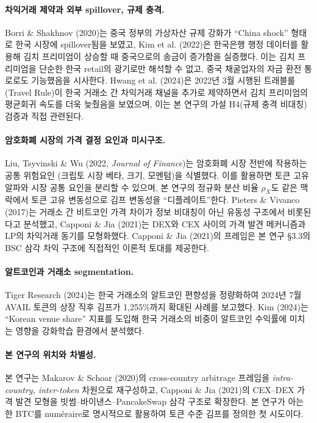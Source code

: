 \documentclass[11pt,a4paper]{article}
\begin{document}
\paragraph{차익거래 제약과 외부 spillover, 규제 충격.}
Borri \& Shakhnov (2020)는 중국 정부의 가상자산 규제 강화가 ``China shock'' 형태로 한국 시장에
spillover됨을 보였고, Kim et al. (2022)은 한국은행 행정 데이터를 활용해 김치 프리미엄이 상승할 때
중국으로의 송금이 증가함을 실증했다. 이는 김치 프리미엄을 단순한 한국 retail의 광기로만 해석할 수 없고,
중국 채굴업자의 자금 환전 통로로도 기능했음을 시사한다. Hwang et al. (2024)은 2022년 3월 시행된
트래블룰(Travel Rule)이 한국 거래소 간 차익거래 채널을 추가로 제약하면서 김치 프리미엄의 평균회귀
속도를 더욱 늦췄음을 보였으며, 이는 본 연구의 가설 H4(규제 충격 비대칭) 검증과 직접 관련된다.

\paragraph{암호화폐 시장의 가격 결정 요인과 미시구조.}
Liu, Tsyvinski \& Wu (2022, \emph{Journal of Finance})는 암호화폐 시장 전반에 작용하는 공통 위험요인
(크립토 시장 베타, 크기, 모멘텀)을 식별했다. 이를 활용하면 토큰 고유 알파와 시장 공통 요인을 분리할 수 있으며,
본 연구의 정규화 분산 비율 $\rho_X$도 같은 맥락에서 토큰 고유 변동성으로 김프 변동성을 ``디플레이트''한다.
Pieters \& Vivanco (2017)는 거래소 간 비트코인 가격 차이가 정보 비대칭이 아닌 유동성 구조에서 비롯된다고 분석했고,
Capponi \& Jia (2021)는 DEX와 CEX 사이의 가격 발견 메커니즘과 LP의 차익거래 동기를 모형화했다.
Capponi \& Jia (2021)의 프레임은 본 연구 §3.3의 BSC 삼각 차익 구조에 직접적인 이론적 토대를 제공한다.

\paragraph{알트코인과 거래소 segmentation.}
Tiger Research (2024)는 한국 거래소의 알트코인 편향성을 정량화하여 2024년 7월 AVAIL 토큰의 상장 직후
김프가 1,255\%까지 확대된 사례를 보고했다. Kim (2024)는 ``Korean venue share'' 지표를 도입해
한국 거래소의 비중이 알트코인 수익률에 미치는 영향을 강화학습 환경에서 분석했다.

\paragraph{본 연구의 위치와 차별성.}
본 연구는 Makarov \& Schoar (2020)의 cross-country arbitrage 프레임을 \emph{intra-country, inter-token}
차원으로 재구성하고, Capponi \& Jia (2021)의 CEX--DEX 가격 발견 모형을 빗썸--바이낸스--PancakeSwap 삼각
구조로 확장한다. 본 연구가 아는 한 BTC를 num\'eraire로 명시적으로 활용하여 토큰 수준 김프를 정의한 첫 시도이다.
\end{document}
